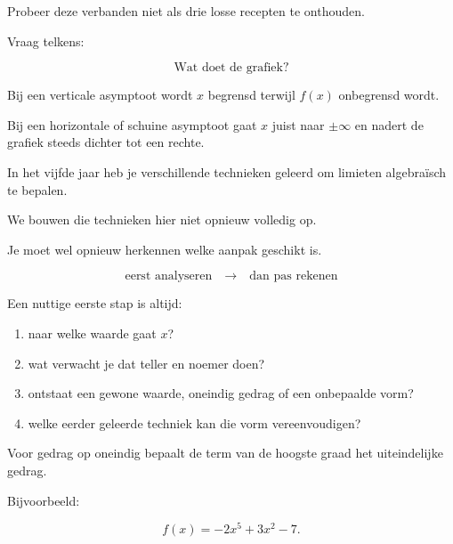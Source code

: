 \documentclass{ximera}
\begin{document}
\begin{opmerking}
Probeer deze verbanden niet als drie losse recepten te onthouden.

Vraag telkens:

\[
\boxed{\text{Wat doet de grafiek?}}
\]

Bij een verticale asymptoot wordt $x$ begrensd terwijl $f(x)$
onbegrensd wordt.

Bij een horizontale of schuine asymptoot gaat $x$ juist naar
$\pm\infty$ en nadert de grafiek steeds dichter tot een rechte.
\end{opmerking}




In het vijfde jaar heb je verschillende technieken geleerd om
limieten algebraïsch te bepalen.

We bouwen die technieken hier niet opnieuw volledig op.

Je moet wel opnieuw herkennen welke aanpak geschikt is.

\begin{center}
\[
\boxed{
\text{eerst analyseren}
\quad\longrightarrow\quad
\text{dan pas rekenen}
}
\]
\end{center}

Een nuttige eerste stap is altijd:

\begin{enumerate}
  \item naar welke waarde gaat $x$?
  \item wat verwacht je dat teller en noemer doen?
  \item ontstaat een gewone waarde, oneindig gedrag of een
        onbepaalde vorm?
  \item welke eerder geleerde techniek kan die vorm vereenvoudigen?
\end{enumerate}




Voor gedrag op oneindig bepaalt de term van de hoogste graad het
uiteindelijke gedrag.

Bijvoorbeeld:

\[
f(x)=-2x^5+3x^2-7.
\]
\end{document}
